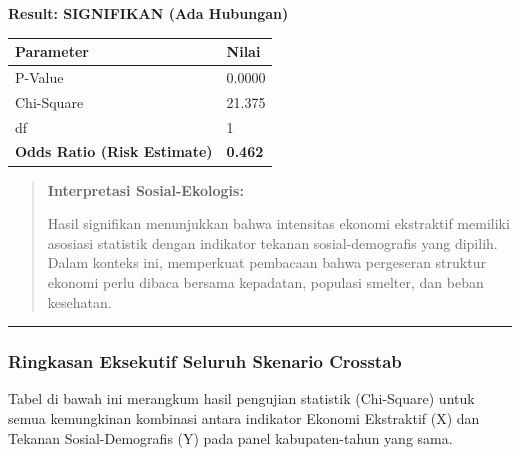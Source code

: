 \documentclass[
]{article}
\newcounter{none} %
\begin{document}
\textbf{Result: SIGNIFIKAN (Ada Hubungan)}

{\def\LTcaptype{none} %
\begin{longtable}[]{@{}ll@{}}
\toprule\noalign{}
Parameter & Nilai \\
\midrule\noalign{}
\endhead
\bottomrule\noalign{}
\endlastfoot
P-Value & 0.0000 \\
Chi-Square & 21.375 \\
df & 1 \\
\textbf{Odds Ratio (Risk Estimate)} & \textbf{0.462} \\
\end{longtable}
}

\begin{quote}
\textbf{Interpretasi Sosial-Ekologis:}

Hasil signifikan menunjukkan bahwa intensitas ekonomi ekstraktif
memiliki asosiasi statistik dengan indikator tekanan sosial-demografis
yang dipilih. Dalam konteks ini, memperkuat pembacaan bahwa pergeseran
struktur ekonomi perlu dibaca bersama kepadatan, populasi smelter, dan
beban kesehatan.
\end{quote}

\begin{center}\rule{0.5\linewidth}{0.5pt}\end{center}

\subsubsection{Ringkasan Eksekutif Seluruh Skenario
Crosstab}\label{ringkasan-eksekutif-seluruh-skenario-crosstab}

Tabel di bawah ini merangkum hasil pengujian statistik (Chi-Square)
untuk semua kemungkinan kombinasi antara indikator Ekonomi Ekstraktif
(X) dan Tekanan Sosial-Demografis (Y) pada panel kabupaten-tahun yang
sama.
\end{document}
